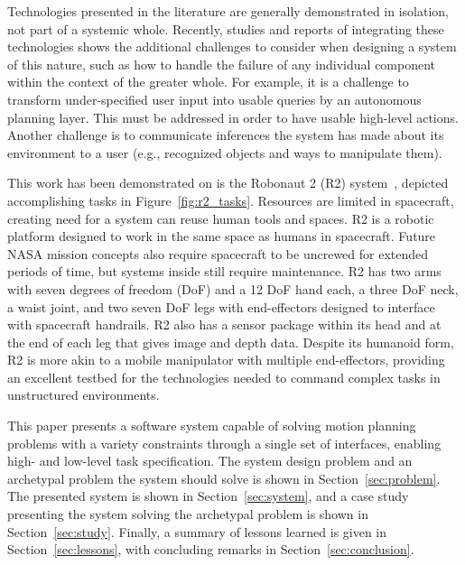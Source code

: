Technologies presented in the literature are generally demonstrated in isolation, not part of a systemic whole.
Recently, studies and reports of integrating these technologies shows the additional challenges to consider when designing a system of this nature, such as how to handle the failure of any individual component within the context of the greater whole.
For example, it is a challenge to transform under-specified user input into usable queries by an autonomous planning layer.
This must be addressed in order to have usable high-level actions.
Another challenge is to communicate inferences the system has made about its environment to a user (e.g., recognized objects and ways to manipulate them).

This work has been demonstrated on is the Robonaut 2 (R2) system~\cite{Diftler2011}, depicted accomplishing tasks in Figure~\ref{fig:r2_tasks}.
Resources are limited in spacecraft, creating need for a system can reuse human tools and spaces.
R2 is a robotic platform designed to work in the same space as humans in spacecraft.
Future NASA mission concepts also require spacecraft to be uncrewed for extended periods of time, but systems inside still require maintenance.
R2 has two arms with seven degrees of freedom (DoF) and a 12 DoF hand each, a three DoF neck, a waist joint, and two seven DoF legs with end-effectors designed to interface with spacecraft handrails.
R2 also has a sensor package within its head and at the end of each leg that gives image and depth data.
Despite its humanoid form, R2 is more akin to a mobile manipulator with multiple end-effectors, providing an excellent testbed for the technologies needed to command complex tasks in unstructured environments. 

This paper presents a software system capable of solving motion planning problems with a variety constraints through a single set of interfaces, enabling high- and low-level task specification.
The system design problem and an archetypal problem the system should solve is shown in Section~\ref{sec:problem}.
The presented system is shown in Section~\ref{sec:system}, and a case study presenting the system solving the archetypal problem is shown in Section~\ref{sec:study}.
Finally, a summary of lessons learned is given in Section~\ref{sec:lessons}, with concluding remarks in Section~\ref{sec:conclusion}.
